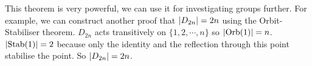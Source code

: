 This theorem is very powerful, we can use it for investigating groups further. For example, we can construct another proof that $\abs{D_{2n}} = 2n$ using the Orbit-Stabiliser theorem. $D_{2n}$ acts transitively on $\{1, 2, \cdots, n\}$ so $\abs{\operatorname{Orb}(1)} = n$. $\abs{\operatorname{Stab}(1)} = 2$ because only the identity and the reflection through this point stabilise the point. So $\abs{D_{2n}} = 2n$.
